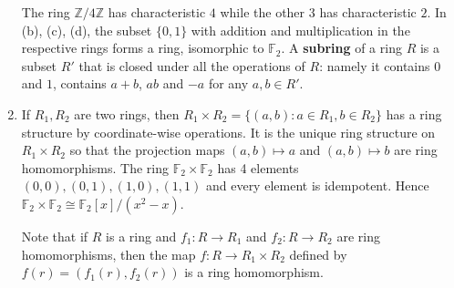 \documentclass{article}
\def\Z{{\mathbb Z}}
\def\F{{\mathbb F}}
\def\Z{{\mathbb Z}}
\def\F{{\mathbb F}}
\begin{document}
\begin{enumerate}
    The ring $\Z/4\Z$ has characteristic $4$ while the other 3 has characteristic $2$. In (b), (c), (d), the subset $\{0,1\}$ with addition and multiplication in the respective rings forms a ring, isomorphic to $\F_2$. A \textbf{subring} of a ring $R$ is a subset $R'$ that is closed under all the operations of $R$: namely it contains $0$ and $1$, contains $a+b$, $ab$ and $-a$ for any $a,b\in R'$.

    \item If $R_1,R_2$ are two rings, then $R_1\times R_2 = \{(a,b)\colon a\in R_1,b\in R_2\}$ has a ring structure by coordinate-wise operations. It is the unique ring structure on $R_1\times R_2$ so that the projection maps $(a,b)\mapsto a$ and $(a,b)\mapsto b$ are ring homomorphisms. The ring $\F_2\times\F_2$ has 4 elements $(0,0), (0,1), (1,0), (1,1)$ and every element is idempotent. Hence $\F_2\times\F_2 \cong \F_2[x]/(x^2 - x)$. 

    Note that if $R$ is a ring and $f_1:R\rightarrow R_1$ and $f_2:R\rightarrow R_2$ are ring homomorphisms, then the map $f:R\rightarrow R_1\times R_2$ defined by $f(r) = (f_1(r), f_2(r))$ is a ring homomorphism. 

\end{enumerate}
\end{document}
